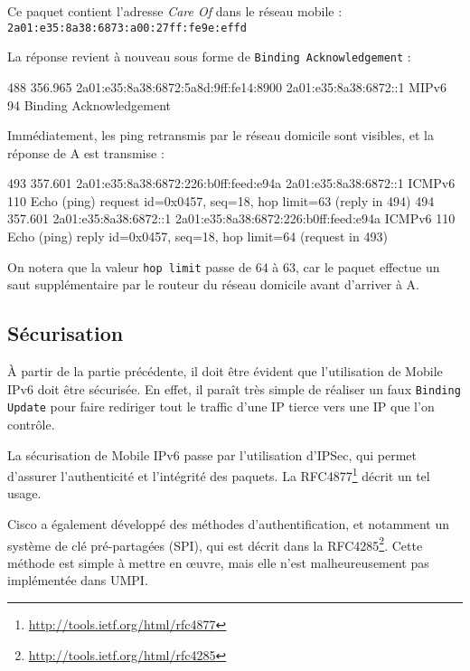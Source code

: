 Ce paquet contient l'adresse \emph{Care Of} dans le réseau mobile : \texttt{2a01:e35:8a38:6873:a00:27ff:fe9e:effd}

La réponse revient à nouveau sous forme de \texttt{Binding Acknowledgement} :

\begin{paquet}
488	356.965	2a01:e35:8a38:6872:5a8d:9ff:fe14:8900	2a01:e35:8a38:6872::1	MIPv6	94	Binding Acknowledgement
\end{paquet}

Immédiatement, les ping retransmis par le réseau domicile sont visibles, et la réponse de A est transmise :

\begin{paquet}
493	357.601	2a01:e35:8a38:6872:226:b0ff:feed:e94a	2a01:e35:8a38:6872::1	ICMPv6	110	Echo (ping) request id=0x0457, seq=18, hop limit=63 (reply in 494)
494	357.601	2a01:e35:8a38:6872::1	2a01:e35:8a38:6872:226:b0ff:feed:e94a	ICMPv6	110	Echo (ping) reply id=0x0457, seq=18, hop limit=64 (request in 493)
\end{paquet}

On notera que la valeur \texttt{hop limit} passe de $64$ à $63$, car le paquet effectue un saut supplémentaire par le routeur du réseau domicile avant d'arriver à A.

\subsection{Sécurisation}

À partir de la partie précédente, il doit être évident que l'utilisation de Mobile IPv6 doit être sécurisée.
En effet, il paraît très simple de réaliser un faux \texttt{Binding Update} pour faire rediriger tout le traffic d'une IP tierce vers une IP que l'on contrôle.

La sécurisation de Mobile IPv6 passe par l'utilisation d'IPSec, qui permet d'assurer l'authenticité et l'intégrité des paquets.
La RFC4877\footnote{\url{http://tools.ietf.org/html/rfc4877}} décrit un tel usage.

Cisco a également développé des méthodes d'authentification, et notamment un système de clé pré-partagées (SPI), qui est décrit dans la RFC4285\footnote{\url{http://tools.ietf.org/html/rfc4285}}.
Cette méthode est simple à mettre en œuvre, mais elle n'est malheureusement pas implémentée dans UMPI.